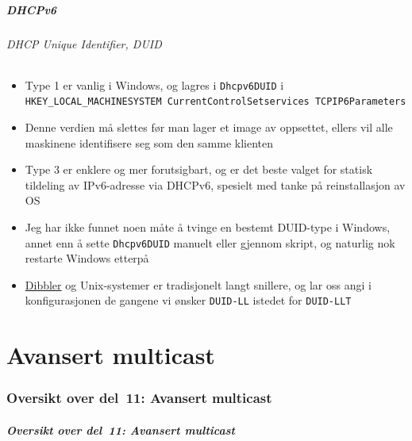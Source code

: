 \begin{frame}%
  \frametitle{DHCPv6}
  \framesubtitle{DHCP Unique Identifier, DUID}
  \begin{itemize}%
  \item Type 1 er vanlig i Windows, og lagres i \texttt{Dhcpv6DUID} i
    \texttt{HKEY\_LOCAL\_MACHINE\Textbackslash SYSTEM\Textbackslash
      CurrentControlSet\Textbackslash services\Textbackslash
      TCPIP6\Textbackslash Parameters}
  \item Denne verdien må slettes før man lager et image av oppsettet,
    ellers vil alle maskinene identifisere seg som den samme klienten
  \item Type 3 er enklere og mer forutsigbart, og er det beste valget
    for statisk tildeling av IPv6-adresse via DHCPv6, spesielt med
    tanke på reinstallasjon av OS
  \item Jeg har ikke funnet noen måte å tvinge en bestemt DUID-type i
    Windows, annet enn å sette \texttt{Dhcpv6DUID} manuelt eller
    gjennom skript, og naturlig nok restarte Windows etterpå
  \item \href{http://klub.com.pl/dhcpv6/}{Dibbler} og Unix-systemer er
    tradisjonelt langt snillere, og lar oss angi i konfigurasjonen de
    gangene vi ønsker \texttt{DUID-LL} istedet for \texttt{DUID-LLT}
  \end{itemize}
\end{frame}

\part{Avansert multicast}

\begin{frame}
  \partpage
\end{frame}

\section*{Oversikt over del~11: Avansert multicast}
\begin{frame}[allowframebreaks]
  \frametitle{Oversikt over del~11: Avansert multicast}
    \tableofcontents%
\end{frame}

